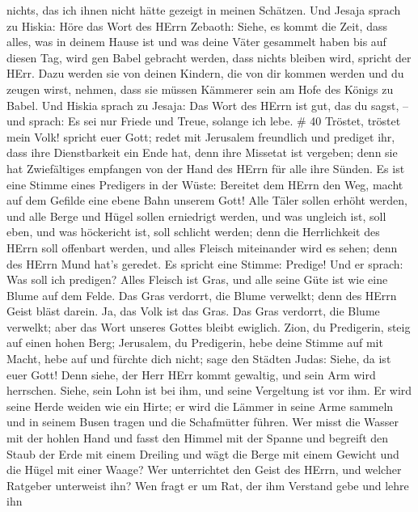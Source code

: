 nichts, das ich ihnen nicht hätte gezeigt in meinen Schätzen.
 Und Jesaja sprach zu Hiskia: Höre das Wort des HErrn
Zebaoth:  Siehe, es kommt die Zeit, dass alles, was in
deinem Hause ist und was deine Väter gesammelt haben bis auf diesen Tag,
wird gen Babel gebracht werden, dass nichts bleiben wird, spricht der
HErr.  Dazu werden sie von deinen Kindern, die von dir
kommen werden und du zeugen wirst, nehmen, dass sie müssen Kämmerer sein
am Hofe des Königs zu Babel.  Und Hiskia sprach zu Jesaja:
Das Wort des HErrn ist gut, das du sagst, -- und sprach: Es sei nur
Friede und Treue, solange ich lebe. \# 40  Tröstet, tröstet
mein Volk! spricht euer Gott;  redet mit Jerusalem
freundlich und prediget ihr, dass ihre Dienstbarkeit ein Ende hat, denn
ihre Missetat ist vergeben; denn sie hat Zwiefältiges empfangen von der
Hand des HErrn für alle ihre Sünden.  Es ist eine Stimme
eines Predigers in der Wüste: Bereitet dem HErrn den Weg, macht auf dem
Gefilde eine ebene Bahn unserem Gott!  Alle Täler sollen
erhöht werden, und alle Berge und Hügel sollen erniedrigt werden, und
was ungleich ist, soll eben, und was höckericht ist, soll schlicht
werden;  denn die Herrlichkeit des HErrn soll offenbart
werden, und alles Fleisch miteinander wird es sehen; denn des HErrn Mund
hat's geredet.  Es spricht eine Stimme: Predige! Und er
sprach: Was soll ich predigen? Alles Fleisch ist Gras, und alle seine
Güte ist wie eine Blume auf dem Felde.  Das Gras verdorrt,
die Blume verwelkt; denn des HErrn Geist bläst darein. Ja, das Volk ist
das Gras.  Das Gras verdorrt, die Blume verwelkt; aber das
Wort unseres Gottes bleibt ewiglich.  Zion, du Predigerin,
steig auf einen hohen Berg; Jerusalem, du Predigerin, hebe deine Stimme
auf mit Macht, hebe auf und fürchte dich nicht; sage den Städten Judas:
Siehe, da ist euer Gott!  Denn siehe, der Herr HErr kommt
gewaltig, und sein Arm wird herrschen. Siehe, sein Lohn ist bei ihm, und
seine Vergeltung ist vor ihm.  Er wird seine Herde weiden
wie ein Hirte; er wird die Lämmer in seine Arme sammeln und in seinem
Busen tragen und die Schafmütter führen.  Wer misst die
Wasser mit der hohlen Hand und fasst den Himmel mit der Spanne und
begreift den Staub der Erde mit einem Dreiling und wägt die Berge mit
einem Gewicht und die Hügel mit einer Waage?  Wer
unterrichtet den Geist des HErrn, und welcher Ratgeber unterweist ihn?
 Wen fragt er um Rat, der ihm Verstand gebe und lehre ihn
